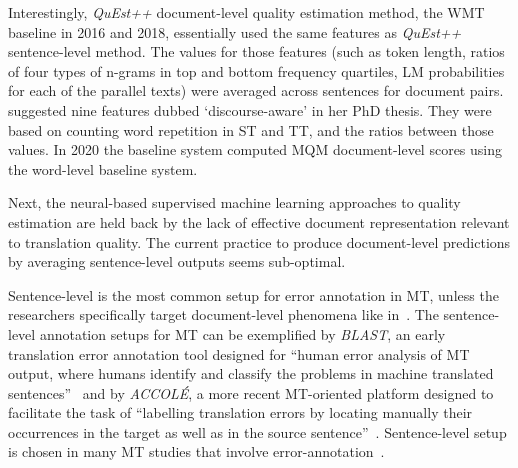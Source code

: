 Interestingly, \textit{QuEst++} document-level quality estimation method, the WMT baseline in 2016 and 2018, essentially used the same features as \textit{QuEst++} sentence-level method. The values for those features (such as token length, ratios of four types of n-grams in top and bottom frequency quartiles, LM probabilities for each of the parallel texts) were averaged across sentences for document pairs. \citet{Scarton2016} suggested nine features dubbed `discourse-aware' in her PhD thesis. They were based on counting word repetition in ST and TT, and the ratios between those values. In 2020 the baseline system computed MQM document-level scores using the word-level baseline system.

Next, the neural-based supervised machine learning approaches to quality estimation are held back by the lack of effective document representation relevant to translation quality. The current practice to produce document-level predictions by averaging sentence-level outputs seems sub-optimal.

Sentence-level is the most common setup for error annotation in MT, unless the researchers specifically target document-level phenomena like in~\citet{Voita2019, Laubli2018}. The sentence-level annotation setups for MT can be exemplified by \textit{BLAST}, an early translation error annotation tool designed for ``human error analysis of MT output, where humans identify and classify the problems in machine translated sentences''~\cite[p.56]{Stymne2011} and by \textit{ACCOL\'E}, a more recent MT-oriented platform designed to facilitate the task of ``labelling translation errors by locating manually their occurrences in the
target as well as in the source sentence''~\cite[p.28]{EsperancaRodier2019}. Sentence-level setup is chosen in many MT studies that involve error-annotation~\cite[see, for example,][]{vanBrussel2018}.

